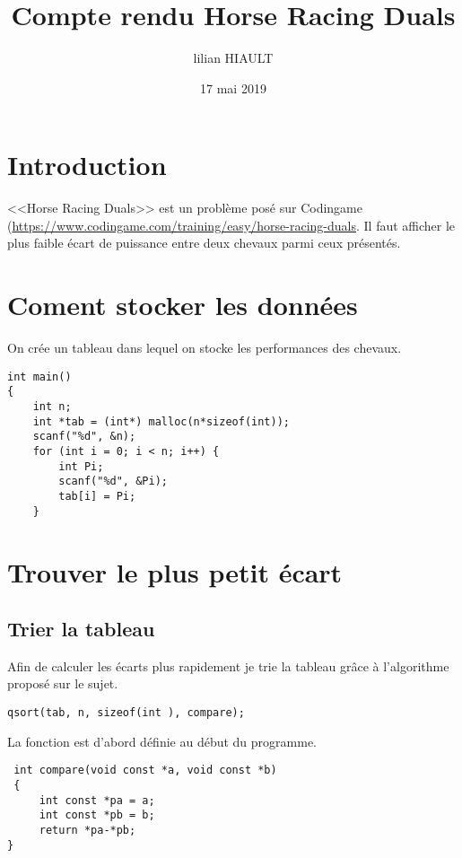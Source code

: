 \documentclass{article}
\title{Compte rendu Horse Racing Duals}
\author{lilian HIAULT}
\date{17 mai 2019}
\begin{document}
\maketitle

\tableofcontents

\section*{Introduction}

<<Horse Racing Duals>> est un problème posé sur Codingame (\url{https://www.codingame.com/training/easy/horse-racing-duals}. Il faut afficher le plus faible écart de puissance entre deux chevaux parmi ceux présentés.

\section{Coment stocker les données}

On crée un tableau dans lequel on stocke les performances des chevaux.


\begin{verbatim}
int main()
{
    int n;
    int *tab = (int*) malloc(n*sizeof(int));
    scanf("%d", &n);
    for (int i = 0; i < n; i++) {
        int Pi;
        scanf("%d", &Pi);
        tab[i] = Pi;
    }
\end{verbatim}

\section{Trouver le plus petit écart}

\subsection{Trier la tableau}

Afin de calculer les écarts plus rapidement je trie la tableau grâce à l'algorithme proposé sur le sujet.

\begin{verbatim}
qsort(tab, n, sizeof(int ), compare);
\end{verbatim}

La fonction est d'abord définie au début du programme.

\begin{verbatim}
 int compare(void const *a, void const *b)
 {
     int const *pa = a;
     int const *pb = b;
     return *pa-*pb;
}
\end{verbatim}
\end{document}
